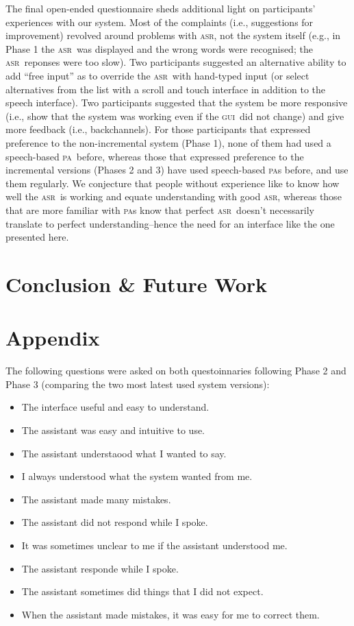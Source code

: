 \documentclass[11pt]{article}
\newcommand{\asr}[0]{\textsc{asr}}
\newcommand{\ui}[0]{\textsc{gui}}
\newcommand{\pa}[0]{\textsc{pa}}
\begin{document}
The final open-ended questionnaire sheds additional light on participants' experiences with our system. Most of the complaints (i.e., suggestions for improvement) revolved around problems with \asr, not the system itself (e.g., in Phase 1 the \asr\ was displayed and the wrong words were recognised; the \asr\ reponses were too slow). Two participants suggested an alternative ability to add ``free input'' as to override the \asr\ with hand-typed input (or select alternatives from the list with a scroll and touch interface in addition to the speech interface). Two participants suggested that the system be more responsive (i.e., show that the system was working even if the \ui\ did not change) and give more feedback (i.e., backchannels). For those participants that expressed preference to the non-incremental system (Phase 1), none of them had used a speech-based \pa\ before, whereas those that expressed preference to the incremental versions (Phases 2 and 3) have used speech-based \pa s before, and use them regularly. We conjecture that people without experience like to know how well the \asr\ is working and equate understanding with good \asr, whereas those that are more familiar with \pa s know that perfect \asr\ doesn't necessarily translate to perfect understanding--hence the need for an interface like the one presented here. 

\section{Conclusion \& Future Work}

\section*{Appendix}

The following questions were asked on both questoinnaries following Phase 2 and Phase 3 (comparing the two most latest used system versions):
\begin{itemize}
 \item The interface useful and easy to understand.
 \item The assistant was easy and intuitive to use.
 \item The assistant understaood what I wanted to say.
 \item I always understood what the system wanted from me. 
 \item The assistant made many mistakes. 
 \item The assistant did not respond while I spoke.
 \item It was sometimes unclear to me if the assistant understood me. 
 \item The assistant responde while I spoke. 
 \item The assistant sometimes did things that I did not expect.
 \item When the assistant made mistakes, it was easy for me to correct them. 
\end{itemize}
\end{document}
